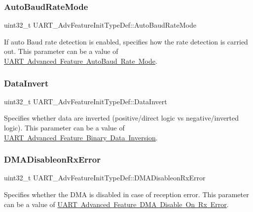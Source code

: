\subsubsection{\texorpdfstring{AutoBaudRateMode}{AutoBaudRateMode}}
{\footnotesize\ttfamily uint32\+\_\+t U\+A\+R\+T\+\_\+\+Adv\+Feature\+Init\+Type\+Def\+::\+Auto\+Baud\+Rate\+Mode}

If auto Baud rate detection is enabled, specifies how the rate detection is carried out. This parameter can be a value of \mbox{\hyperlink{group___u_a_r_t___auto_baud___rate___mode}{U\+A\+RT Advanced Feature Auto\+Baud Rate Mode}}. \mbox{\label{struct_u_a_r_t___adv_feature_init_type_def_aec98c08519e2f0c713b2c2a0213e0772}} 
\subsubsection{\texorpdfstring{DataInvert}{DataInvert}}
{\footnotesize\ttfamily uint32\+\_\+t U\+A\+R\+T\+\_\+\+Adv\+Feature\+Init\+Type\+Def\+::\+Data\+Invert}

Specifies whether data are inverted (positive/direct logic vs negative/inverted logic). This parameter can be a value of \mbox{\hyperlink{group___u_a_r_t___data___inv}{U\+A\+RT Advanced Feature Binary Data Inversion}}. \mbox{\label{struct_u_a_r_t___adv_feature_init_type_def_a63254643e43080158d23d3bbe9d53430}} 
\subsubsection{\texorpdfstring{DMADisableonRxError}{DMADisableonRxError}}
{\footnotesize\ttfamily uint32\+\_\+t U\+A\+R\+T\+\_\+\+Adv\+Feature\+Init\+Type\+Def\+::\+D\+M\+A\+Disableon\+Rx\+Error}

Specifies whether the D\+MA is disabled in case of reception error. This parameter can be a value of \mbox{\hyperlink{group___u_a_r_t___d_m_a___disable__on___rx___error}{U\+A\+RT Advanced Feature D\+MA Disable On Rx Error}}. \mbox{\label{struct_u_a_r_t___adv_feature_init_type_def_a64f5cd00608df17cc6be37e98744f9ab}} 
